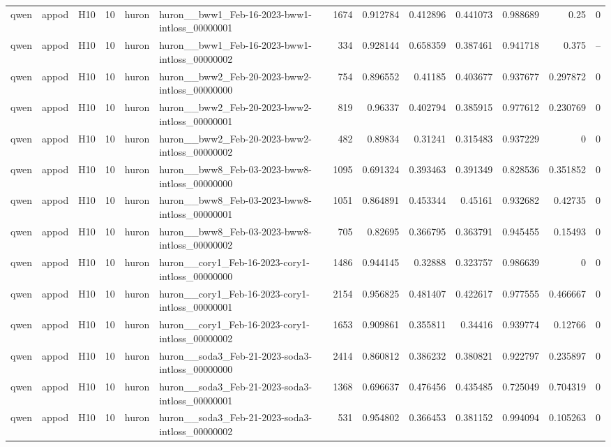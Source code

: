\begin{longtable}{lllrllrrrrrrr}
qwen & appod & H10 & 10 & huron & huron\_\_bww1\_Feb-16-2023-bww1-intloss\_00000001 & 1674 & 0.912784 & 0.412896 & 0.441073 & 0.988689 & 0.25 & 0 \\
qwen & appod & H10 & 10 & huron & huron\_\_bww1\_Feb-16-2023-bww1-intloss\_00000002 & 334 & 0.928144 & 0.658359 & 0.387461 & 0.941718 & 0.375 & -- \\
qwen & appod & H10 & 10 & huron & huron\_\_bww2\_Feb-20-2023-bww2-intloss\_00000000 & 754 & 0.896552 & 0.41185 & 0.403677 & 0.937677 & 0.297872 & 0 \\
qwen & appod & H10 & 10 & huron & huron\_\_bww2\_Feb-20-2023-bww2-intloss\_00000001 & 819 & 0.96337 & 0.402794 & 0.385915 & 0.977612 & 0.230769 & 0 \\
qwen & appod & H10 & 10 & huron & huron\_\_bww2\_Feb-20-2023-bww2-intloss\_00000002 & 482 & 0.89834 & 0.31241 & 0.315483 & 0.937229 & 0 & 0 \\
qwen & appod & H10 & 10 & huron & huron\_\_bww8\_Feb-03-2023-bww8-intloss\_00000000 & 1095 & 0.691324 & 0.393463 & 0.391349 & 0.828536 & 0.351852 & 0 \\
qwen & appod & H10 & 10 & huron & huron\_\_bww8\_Feb-03-2023-bww8-intloss\_00000001 & 1051 & 0.864891 & 0.453344 & 0.45161 & 0.932682 & 0.42735 & 0 \\
qwen & appod & H10 & 10 & huron & huron\_\_bww8\_Feb-03-2023-bww8-intloss\_00000002 & 705 & 0.82695 & 0.366795 & 0.363791 & 0.945455 & 0.15493 & 0 \\
qwen & appod & H10 & 10 & huron & huron\_\_cory1\_Feb-16-2023-cory1-intloss\_00000000 & 1486 & 0.944145 & 0.32888 & 0.323757 & 0.986639 & 0 & 0 \\
qwen & appod & H10 & 10 & huron & huron\_\_cory1\_Feb-16-2023-cory1-intloss\_00000001 & 2154 & 0.956825 & 0.481407 & 0.422617 & 0.977555 & 0.466667 & 0 \\
qwen & appod & H10 & 10 & huron & huron\_\_cory1\_Feb-16-2023-cory1-intloss\_00000002 & 1653 & 0.909861 & 0.355811 & 0.34416 & 0.939774 & 0.12766 & 0 \\
qwen & appod & H10 & 10 & huron & huron\_\_soda3\_Feb-21-2023-soda3-intloss\_00000000 & 2414 & 0.860812 & 0.386232 & 0.380821 & 0.922797 & 0.235897 & 0 \\
qwen & appod & H10 & 10 & huron & huron\_\_soda3\_Feb-21-2023-soda3-intloss\_00000001 & 1368 & 0.696637 & 0.476456 & 0.435485 & 0.725049 & 0.704319 & 0 \\
qwen & appod & H10 & 10 & huron & huron\_\_soda3\_Feb-21-2023-soda3-intloss\_00000002 & 531 & 0.954802 & 0.366453 & 0.381152 & 0.994094 & 0.105263 & 0 \\

\end{longtable}
